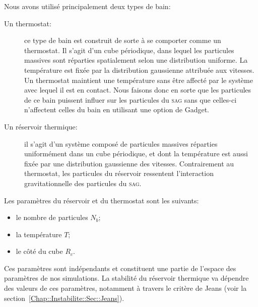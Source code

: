 	Nous avons utilisé principalement deux types de bain:
	\begin{description}

		\item[Un thermostat:] ce type de bain est construit de sorte à se comporter comme un
			thermostat. Il s'agit d'un cube périodique, dans lequel les particules massives sont
			réparties spatialement selon une distribution uniforme. La température est fixée par la
			distribution gaussienne attribuée aux vitesses. Un thermostat maintient une
			température sans être affecté par le système avec lequel il est en contact.
			Nous faisons donc en sorte que les particules de ce bain puissent influer sur les
			particules du \textsc{sag} sans que celles-ci n'affectent celles du bain en utilisant
			une option de Gadget.

		\item[Un réservoir thermique:] il s'agit d'un système composé de particules massives réparties
			uniformément dans un cube périodique, et dont la température est aussi fixée par une
			distribution gaussienne des vitesses. Contrairement au thermostat, les particules du
			réservoir ressentent l'interaction gravitationnelle des particules du \textsc{sag}.


	\end{description}

	Les paramètres du réservoir et du thermostat sont les suivants:
	\begin{itemize}
		\item le nombre de particules $N_b$;
		\item la température $T$;
		\item le côté du cube $R_c$.
	\end{itemize}
	Ces paramètres sont indépendants et constituent une partie de l'espace des paramètres de nos
	simulations. La stabilité du réservoir thermique va dépendre des valeurs de ces paramètres, notamment à
	travers le critère de Jeans (voir la section~\ref{Chap::Instabilite::Sec::Jeans}).

